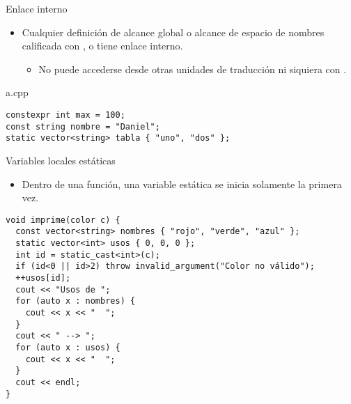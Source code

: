 \begin{frame}[fragile]{Enlace interno}
\begin{itemize}
  \item Cualquier definición de alcance global o alcance de espacio de nombres
        calificada con ,  o 
        tiene enlace interno.
    \begin{itemize}
      \item No puede accederse desde otras unidades de traducción ni siquiera con .
    \end{itemize}
\end{itemize}
\begin{block}{a.cpp}
\begin{lstlisting}
constexpr int max = 100;
const string nombre = "Daniel";
static vector<string> tabla { "uno", "dos" };
\end{lstlisting}
\end{block}
\end{frame}

\begin{frame}[fragile]{Variables locales estáticas}
\begin{itemize}
  \item Dentro de una función, una variable estática se inicia solamente la primera vez.
\end{itemize}
\begin{lstlisting}
void imprime(color c) {
  const vector<string> nombres { "rojo", "verde", "azul" };
  static vector<int> usos { 0, 0, 0 };
  int id = static_cast<int>(c);
  if (id<0 || id>2) throw invalid_argument("Color no válido");
  ++usos[id];
  cout << "Usos de ";
  for (auto x : nombres) {
    cout << x << "  ";
  }
  cout << " --> ";
  for (auto x : usos) {
    cout << x << "  ";
  }
  cout << endl;
}
\end{lstlisting}
\end{frame}

